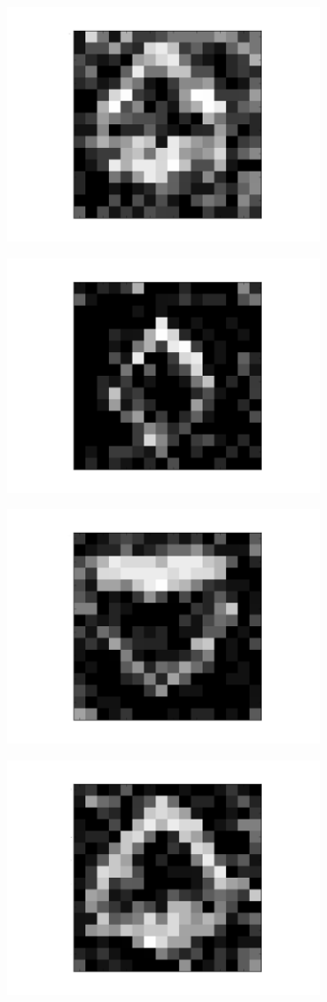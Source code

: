 \begin{figure}[h!]
	
	\begin{subfigure}{.25\textwidth}
  		\centering
  		\includegraphics[width=.6\linewidth]{imgs/poker/recon_img6.png}
  		\label{fig:sub1}
	\end{subfigure}%
	\begin{subfigure}{.25\textwidth}
  		\centering
  		\includegraphics[width=.6\linewidth]{imgs/poker/recon_img4.png}
  		\label{fig:sub1}
	\end{subfigure}%
	\begin{subfigure}{.25\textwidth}
  		\centering
  		\includegraphics[width=.6\linewidth]{imgs/poker/recon_img2.png}
  		\label{fig:sub1}
	\end{subfigure}%
	\begin{subfigure}{.25\textwidth}
  		\centering
  		\includegraphics[width=.6\linewidth]{imgs/poker/recon_img8.png}

\end{subfigure}
\end{figure}
